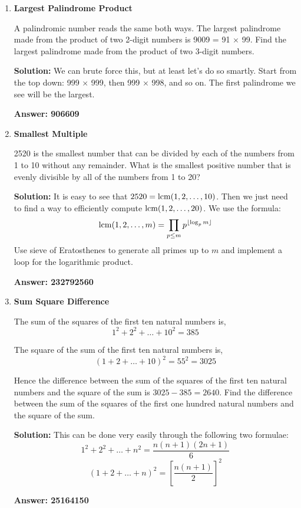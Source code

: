 \documentclass[12pt]{article}
\begin{document}
\begin{enumerate}
    \item \textbf{Largest Palindrome Product}
    \par A palindromic number reads the same both ways. The largest palindrome made from the product of two 2-digit numbers is 9009 = 91 $\times$ 99. Find the largest palindrome made from the product of two 3-digit numbers.
    \par \textbf{Solution:} We can brute force this, but at least let's do so smartly. Start from the top down: 999 $\times$ 999, then 999 $\times$ 998, and so on. The first palindrome we see will be the largest.
    \par \textbf{Answer: 906609}

    \item \textbf{Smallest Multiple}
    \par 2520 is the smallest number that can be divided by each of the numbers from 1 to 10 without any remainder. What is the smallest positive number that is evenly divisible by all of the numbers from 1 to 20?
    \par \textbf{Solution:} It is easy to see that $2520 = \operatorname{lcm}(1, 2, \ldots, 10)$. Then we just need to find a way to efficiently compute $\operatorname{lcm}(1,2, \ldots, 20)$. We use the formula:
    \begin{equation*}
        \operatorname{lcm}(1,2,\ldots,m) = \prod_{p \leq m} p^{\lfloor \log_p m \rfloor} 
    \end{equation*}
    Use sieve of Eratosthenes to generate all primes up to $m$ and implement a loop for the logarithmic product.
    \par \textbf{Answer: 232792560}

    \item \textbf{Sum Square Difference}
    \par The sum of the squares of the first ten natural numbers is,
    \begin{equation*}
        1^2 + 2^2 +  \ldots + 10^2 = 385
    \end{equation*}
    \par The square of the sum of the first ten natural numbers is,
    \begin{equation*}
        (1+2+\ldots+10)^2 = 55^2 = 3025
    \end{equation*}
    \par Hence the difference between the sum of the squares of the first ten natural numbers and the square of the sum is $3025 - 385 = 2640$. Find the difference between the sum of the squares of the first one hundred natural numbers and the square of the sum.
    \par \textbf{Solution:} This can be done very easily through the following two formulae:
    \begin{equation*}
        1^2 + 2^2 +  \ldots + n^2 = \dfrac{n(n+1)(2n+1)}{6}
    \end{equation*}
    \begin{equation*}
        (1+2+\ldots+n)^2 = \left[ \dfrac{n(n+1)}{2} \right]^2
    \end{equation*}
    \par \textbf{Answer: 25164150}


\end{enumerate}
\end{document}
